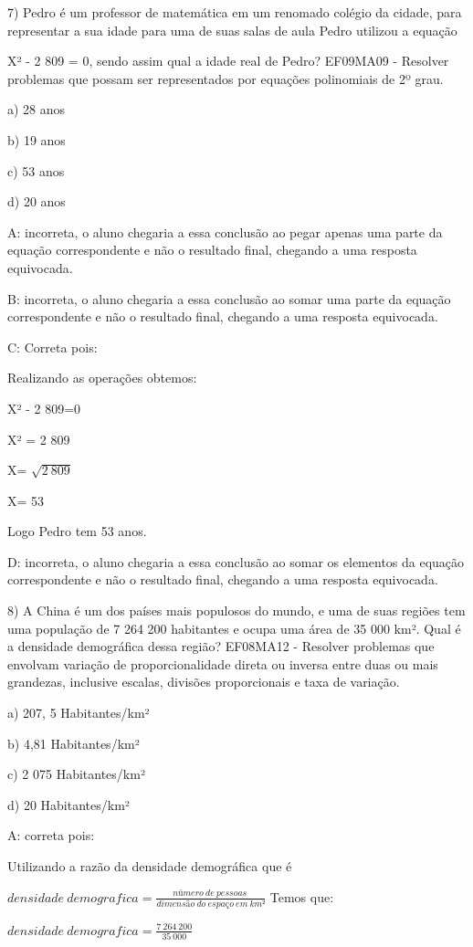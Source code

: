 {7) Pedro é um professor de matemática em um renomado colégio da cidade,
para representar a sua idade para uma de suas salas de aula Pedro
utilizou a equação

X² - 2 809 = 0, sendo assim qual a idade real de Pedro? EF09MA09 -
Resolver problemas que possam ser representados por equações polinomiais
de 2º grau.

a) 28 anos

b) 19 anos

c) 53 anos

d) 20 anos

A: incorreta, o aluno chegaria a essa conclusão ao pegar apenas uma
parte da equação correspondente e não o resultado final, chegando a uma
resposta equivocada.

B: incorreta, o aluno chegaria a essa conclusão ao somar uma parte da
equação correspondente e não o resultado final, chegando a uma resposta
equivocada.

C: Correta pois:

Realizando as operações obtemos:

X² - 2 809=0

X² = 2 809

X= \(\sqrt{2\ 809}\)

X= 53

Logo Pedro tem 53 anos.

D: incorreta, o aluno chegaria a essa conclusão ao somar os elementos da
equação correspondente e não o resultado final, chegando a uma resposta
equivocada.

8) A China é um dos países mais populosos do mundo, e uma de suas
regiões tem uma população de 7 264 200 habitantes e ocupa uma área de 35
000 km². Qual é a densidade demográfica dessa região? EF08MA12 -
Resolver problemas que envolvam variação de proporcionalidade direta ou
inversa entre duas ou mais grandezas, inclusive escalas, divisões
proporcionais e taxa de variação.

a) 207, 5 Habitantes/km²

b) 4,81 Habitantes/km²

c) 2 075 Habitantes/km²

d) 20 Habitantes/km²

A: correta pois:

Utilizando a razão da densidade demográfica que é

\(densidade\ demografica = \frac{número\ de\ pessoas\ }{dimensão\ do\ espaço\ em\ km²}\)
Temos que:

\(densidade\ demografica = \frac{7\ 264\ 200}{35\ 000}\)

}
